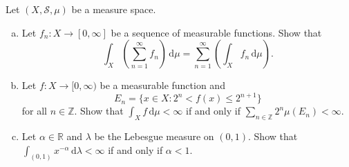 \documentclass[10pt]{article}
\newcommand{\dd}{\,\mathrm{d}}
\providecommand{\RR}{\mathbb R}
\providecommand{\ZZ}{\mathbb Z}
\providecommand{\ii}{\item}
\begin{document}
\begin{problem}
    Let $(X,\mathcal S,\mu)$ be a measure space.
    \begin{enumerate}[(a)]
	\ii Let $f_n\colon X\to[0,\infty]$ be a sequence of measurable functions.
	Show that
	\begin{equation*}
	    \int_X\left(\sum_{n=1}^\infty f_n\right)\dd\mu =
	    \sum_{n=1}^\infty \left(\int_X f_n\dd\mu\right).
	\end{equation*}
	\ii Let $f\colon X\to[0,\infty)$ be a measurable function and
	\begin{equation*}
	    E_n = \{x\in X : 2^n < f(x) \le 2^{n+1}\}
	\end{equation*}
	for all $n\in\ZZ$. Show that $\int_X f\dd\mu<\infty$
	if and only if $\sum_{n\in\ZZ} 2^n\mu(E_n) < \infty$.
	\ii Let $\alpha\in\RR$ and $\lambda$ be the Lebesgue measure on $(0,1)$.
	Show that $\int_{(0,1)} x^{-\alpha}\dd\lambda<\infty$ if and only if
	$\alpha < 1$.
    \end{enumerate}
\end{problem}
\end{document}
